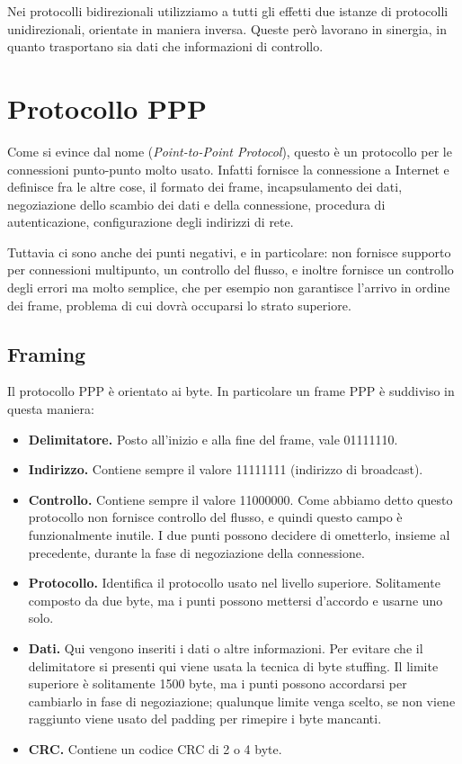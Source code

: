         Nei protocolli bidirezionali utilizziamo a tutti gli effetti due istanze di protocolli unidirezionali, orientate in maniera inversa. Queste però lavorano in sinergia, in quanto trasportano sia dati che informazioni di controllo.
        
\section{Protocollo PPP}
    Come si evince dal nome (\textit{Point-to-Point Protocol}), questo è un protocollo per le connessioni punto-punto molto usato. Infatti fornisce la connessione a Internet e definisce fra le altre cose, il formato dei frame, incapsulamento dei dati, negoziazione dello scambio dei dati e della connessione, procedura di autenticazione, configurazione degli indirizzi di rete.
    
    Tuttavia ci sono anche dei punti negativi, e in particolare: non fornisce supporto per connessioni multipunto, un controllo del flusso, e inoltre fornisce un controllo degli errori ma molto semplice, che per esempio non garantisce l'arrivo in ordine dei frame, problema di cui dovrà occuparsi lo strato superiore.
    
    \subsection{Framing}
        Il protocollo PPP è orientato ai byte. In particolare un frame PPP è suddiviso in questa maniera:
        \begin{itemize}
            \item \textbf{Delimitatore.} Posto all'inizio e alla fine del frame, vale 01111110.
            
            \item \textbf{Indirizzo.} Contiene sempre il valore 11111111 (indirizzo di broadcast).
            
            \item \textbf{Controllo.} Contiene sempre il valore 11000000. Come abbiamo detto questo protocollo non fornisce controllo del flusso, e quindi questo campo è funzionalmente inutile. I due punti possono decidere di ometterlo, insieme al precedente, durante la fase di negoziazione della connessione.
            
            \item \textbf{Protocollo.} Identifica il protocollo usato nel livello superiore. Solitamente composto da due byte, ma i punti possono mettersi d'accordo e usarne uno solo.
            
            \item \textbf{Dati.} Qui vengono inseriti i dati o altre informazioni. Per evitare che il delimitatore si presenti qui viene usata la tecnica di byte stuffing. Il limite superiore è solitamente 1500 byte, ma i punti possono accordarsi per cambiarlo in fase di negoziazione; qualunque limite venga scelto, se non viene raggiunto viene usato del padding per rimepire i byte mancanti.
            
            \item \textbf{CRC.} Contiene un codice CRC di 2 o 4 byte.
        \end{itemize}
        
